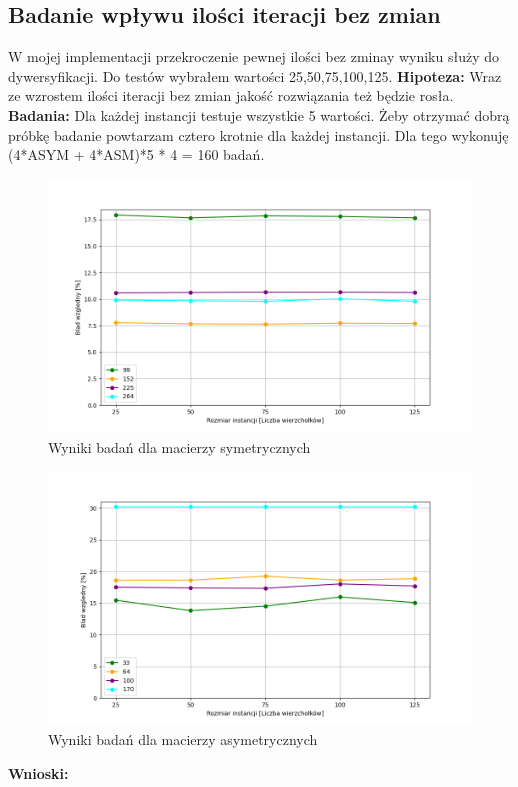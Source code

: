 \documentclass{article}
\begin{document}
      \subsection{Badanie wpływu ilości iteracji bez zmian}
        W mojej implementacji przekroczenie pewnej ilości bez zminay wyniku
        służy do dywersyfikacji. Do testów wybrałem wartości 25,50,75,100,125.\linebreak
        \textbf{Hipoteza: } Wraz ze wzrostem ilości iteracji bez zmian jakość
        rozwiązania też będzie rosła.\linebreak
        \textbf{Badania: } Dla każdej instancji testuje wszystkie 5 wartości. 
        Żeby otrzymać dobrą próbkę badanie powtarzam cztero krotnie dla każdej 
        instancji. Dla tego wykonuję (4*ASYM + 4*ASM)*5 * 4 = 160 badań.\linebreak
        
        \FloatBarrier
        \begin{figure}[ht]
          \centering
          \includegraphics[width=\textwidth]{src/plots/symTsCount.png}
          \caption{Wyniki badań dla macierzy symetrycznych}
          \label{fig:symCount}
        \end{figure}
        \begin{figure}[ht]
          \centering
          \includegraphics[width=\textwidth]{src/plots/asymTsCount.png}
          \caption{Wyniki badań dla macierzy asymetrycznych}
          \label{fig:asymCount}
        \end{figure}
        \FloatBarrier
        \textbf{Wnioski: } 
\end{document}
